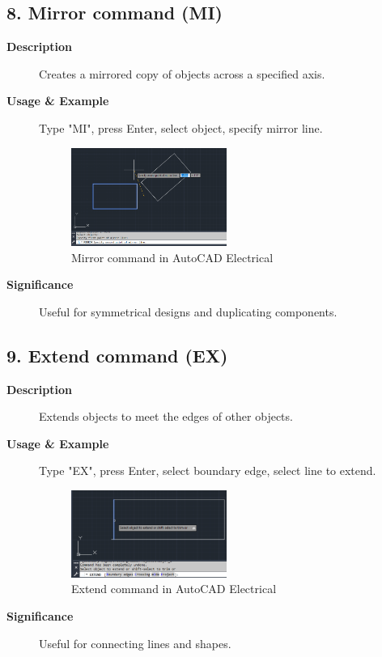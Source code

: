 \documentclass[12pt]{article}
\begin{document}
\subsection*{8. Mirror command (MI)}
\begin{description}
    \item [\textbf{Description}] Creates a mirrored copy of objects across a specified axis.
    \item [\textbf{Usage \& Example}] Type "MI", press Enter, select object, specify mirror line.
          \begin{figure}[H]
              \centering
              \includegraphics[width=0.5\textwidth]{mirror_command.png}
              \caption{Mirror command in AutoCAD Electrical}
          \end{figure}
    \item [\textbf{Significance}] Useful for symmetrical designs and duplicating components.
\end{description}

\subsection*{9. Extend command (EX)}
\begin{description}
    \item [\textbf{Description}] Extends objects to meet the edges of other objects.
    \item [\textbf{Usage \& Example}] Type "EX", press Enter, select boundary edge, select line to extend.
          \begin{figure}[H]
              \centering
              \includegraphics[width=0.5\textwidth]{extend_command.png}
              \caption{Extend command in AutoCAD Electrical}
          \end{figure}
    \item [\textbf{Significance}] Useful for connecting lines and shapes.
\end{description}
\end{document}
